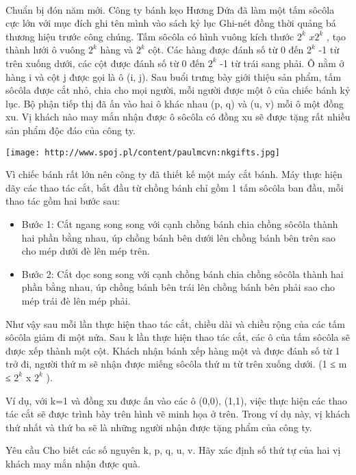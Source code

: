  

Chuẩn bị đón năm mới. Công ty bánh kẹo Hương Dứa đã làm một tấm sôcôla cực lớn với mục đích ghi tên mình vào sách kỷ lục Ghi-nét đồng thời quảng bá thương hiệu trước công chúng. Tấm sôcôla có hình vuông kích thước $2^{k}$ $x2^{k}$ , tạo thành lưới ô vuông $2^{k}$ hàng và $2^{k}$ cột. Các hàng được đánh số từ 0 đến $2^{k}$ -1 từ trên xuống dưới, các cột được đánh số từ 0 đến $2^{k}$ -1 từ trái sang phải. Ô nằm ở hàng i và cột j được gọi là ô (i, j). Sau buổi trưng bày giới thiệu sản phẩm, tấm sôcôla được cắt nhỏ, chia cho mọi người, mỗi người được một ô của chiếc bánh kỷ lục. Bộ phận tiếp thị đã ấn vào hai ô khác nhau (p, q) và (u, v) mỗi ô một đồng xu. Vị khách nào may mắn nhận được ô sôcôla có đồng xu sẽ được tặng rất nhiều sản phẩm độc đáo của công ty.


\texttt{[image: http://www.spoj.pl/content/paulmcvn:nkgifts.jpg]}

Vì chiếc bánh rất lớn nên công ty đã thiết kế một máy cắt bánh. Máy thực hiện dãy các thao tác cắt, bắt đầu từ chồng bánh chỉ gồm 1 tấm sôcôla ban đầu, mỗi thao tác gồm hai bước sau:
\begin{itemize}
	\item Bước 1: Cắt ngang song song với cạnh chồng bánh chia chồng sôcôla thành hai phần bằng nhau, úp chồng bánh bên dưới lên chồng bánh bên trên sao cho mép dưới đè lên mép trên.
	\item Bước 2: Cắt dọc song song với cạnh chồng bánh chia chồng sôcôla thành hai phần bằng nhau, úp chồng bánh bên trái lên chồng bánh bên phải sao cho mép trái đè lên mép phải.
\end{itemize}

Như vậy sau mỗi lần thực hiện thao tác cắt, chiều dài và chiều rộng của các tấm sôcôla giảm đi một nửa. Sau k lần thực hiện thao tác cắt, các ô của tấm sôcôla sẽ được xếp thành một cột. Khách nhận bánh xếp hàng một và được đánh số từ 1 trở đi, người thứ m sẽ nhận được miếng sôcôla thứ m từ trên xuống dưới. (1 ≤ m ≤ $2^{k}$ x $2^{k}$ ).

Ví dụ, với k=1 và đồng xu được ấn vào các ô (0,0), (1,1), việc thực hiện các thao tác cắt sẽ được trình bày trên hình vẽ minh họa ở trên. Trong ví dụ này, vị khách thứ nhất và thứ ba sẽ là những người nhận được tặng phẩm của công ty.

Yêu cầu
Cho biết các số nguyên k, p, q, u, v. Hãy xác định số thứ tự của hai vị khách may mắn nhận được quà.